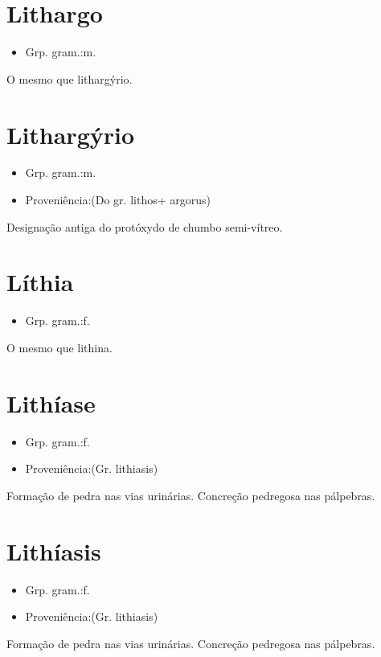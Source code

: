 \section{Lithargo}
\begin{itemize}
\item {Grp. gram.:m.}
\end{itemize}
O mesmo que \textunderscore lithargýrio\textunderscore .
\section{Lithargýrio}
\begin{itemize}
\item {Grp. gram.:m.}
\end{itemize}
\begin{itemize}
\item {Proveniência:(Do gr. \textunderscore lithos\textunderscore  + \textunderscore argorus\textunderscore )}
\end{itemize}
Designação antiga do protóxydo de chumbo semi-vítreo.
\section{Líthia}
\begin{itemize}
\item {Grp. gram.:f.}
\end{itemize}
O mesmo que \textunderscore lithina\textunderscore .
\section{Lithíase}
\begin{itemize}
\item {Grp. gram.:f.}
\end{itemize}
\begin{itemize}
\item {Proveniência:(Gr. \textunderscore lithiasis\textunderscore )}
\end{itemize}
Formação de pedra nas vias urinárias.
Concreção pedregosa nas pálpebras.
\section{Lithíasis}
\begin{itemize}
\item {Grp. gram.:f.}
\end{itemize}
\begin{itemize}
\item {Proveniência:(Gr. \textunderscore lithiasis\textunderscore )}
\end{itemize}
Formação de pedra nas vias urinárias.
Concreção pedregosa nas pálpebras.
